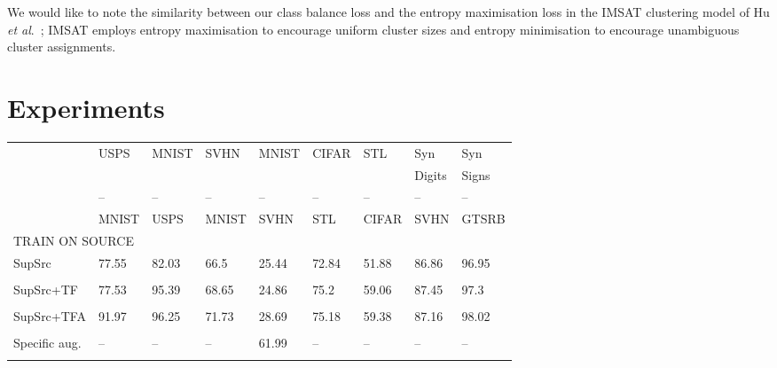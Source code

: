 \documentclass{article}
\newcommand{\etal}{\textit{et al}.}
\begin{document}
We would like to note the similarity between our class balance loss and the entropy maximisation loss in the IMSAT clustering model of Hu \etal~\cite{Hu:IMSAT}; IMSAT employs entropy maximisation to encourage uniform cluster sizes and entropy minimisation to encourage unambiguous cluster assignments.


\section{Experiments}
\label{sec:exp}

\begin{table}[!t]
\begin{center}
\begin{threeparttable}
\footnotesize
\begin{tabular}{lllllllll}
\hline
\hline
{} & USPS & MNIST & SVHN & MNIST & CIFAR & STL & Syn & Syn \\
{} &  &  &  &  &  &  & Digits & Signs \\
{} & -- & -- & -- & -- & -- & -- & -- & -- \\
{} & MNIST & USPS & MNIST & SVHN & STL & CIFAR & SVHN & GTSRB \\
\hline
\hline
\multicolumn{9}{l}{TRAIN ON SOURCE} \\
\rule{0pt}{2.5ex}SupSrc\tnote{*}      &
        77.55 &        82.03 &          66.5 &        25.44 &       72.84 &       51.88 &             86.86 &         96.95 \\
&    &    &     &     &   &   &         &         \\

SupSrc+TF       &
        77.53 &        95.39 &         68.65 &        24.86 &        75.2 &       59.06 &             87.45 &              97.3 \\
&   &    &      &    &   &   &         &         \\

SupSrc+TFA       &
        91.97 &        96.25 &         71.73 &        28.69 &       75.18 &       59.38 &             87.16 &             98.02 \\
&   &    &     &    &   &   &         &         \\

Specific aug.\tnote{b} &
           -- &           -- &            -- &        61.99 &          -- &          -- &                -- &                -- \\
&             &              &               &     &             &             &                   &                   \\


\end{tabular}
\end{threeparttable}
\end{center}
\end{table}
\end{document}
